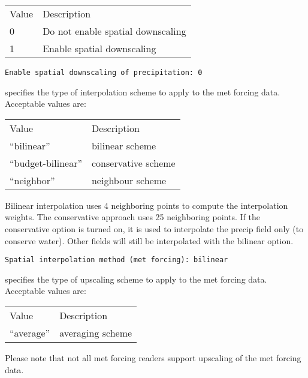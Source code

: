  \begin{tabular}{ll}
 Value & Description                       \\
 0     & Do not enable spatial downscaling \\
 1     & Enable spatial downscaling        \\
 \end{tabular}
 

 \begin{Verbatim}[frame=single]
Enable spatial downscaling of precipitation: 0
 \end{Verbatim}

 
 specifies the type of interpolation scheme to
 apply to the met forcing data.
 Acceptable values are:

 \begin{tabular}{ll}
 Value               & Description                              \\
 ``bilinear''        & bilinear scheme                          \\
 ``budget-bilinear'' & conservative scheme                      \\
 ``neighbor''        & neighbour scheme                         \\
 \end{tabular}

 Bilinear interpolation uses 4 neighboring points to compute the
 interpolation weights. The conservative approach uses 25 neighboring
 points. If the conservative
 option is turned on, it is used to interpolate the precip field only (to
 conserve water). Other fields will still be interpolated with the
 bilinear option.
 

 \begin{Verbatim}[frame=single]
Spatial interpolation method (met forcing): bilinear
 \end{Verbatim}

 
 specifies the type of upscaling scheme to
 apply to the met forcing data.
 Acceptable values are:

 \begin{tabular}{ll}
 Value               & Description                              \\
 ``average''         & averaging scheme                         \\
 \end{tabular}

 Please note that not all met forcing readers support upscaling
 of the met forcing data.
 

